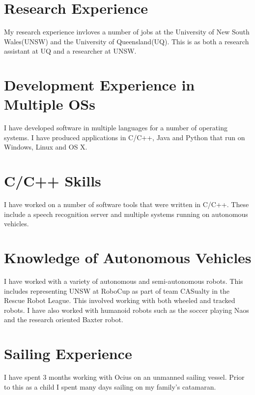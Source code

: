 \documentclass[11pt, a4paper]{awesome-deedy}
\begin{document}
\makecvheader

\makelettertitle

\begin{cvletter}

\section{Research Experience}

My research experience invloves a number of jobs at the University of New South Wales(UNSW) and the University of Queensland(UQ).  This is as both a research assistant at UQ and a researcher at UNSW.

\section{Development Experience in Multiple OSs}

I have developed software in multiple languages for a number of operating systems. I have produced applications in C/C++, Java and Python that run on Windows, Linux and OS X.

\section{C/C++ Skills}

I have worked on a number of software tools that were written in C/C++.  These include a speech recognition server and multiple systems running on autonomous vehicles. 

\section{Knowledge of Autonomous Vehicles}

I have worked with a variety of autonomous and semi-autonomous robots.  This includes representing UNSW at RoboCup as part of team CASualty in the Rescue Robot League.
This involved working with both wheeled and tracked robots.  I have also worked with humanoid robots such as the soccer playing Naos and the research oriented Baxter robot. 

\section{Sailing Experience}

I have spent 3 months working with Ocius on an unmanned sailing vessel.  Prior to this as a child I spent many days sailing on my family's catamaran.

\end{cvletter}

\makeletterclosing
\end{document}
